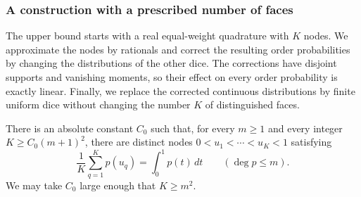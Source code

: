 \subsubsection{A construction with a prescribed number of faces}

The upper bound starts with a real equal-weight quadrature with \(K\)
nodes.  We approximate the nodes by rationals and correct the resulting
order probabilities by changing the distributions of the other dice.
The corrections have disjoint supports and vanishing moments, so their
effect on every order probability is exactly linear.  Finally, we replace
the corrected continuous distributions by finite uniform dice without
changing the number \(K\) of distinguished faces.

\begin{lemma}\label{individual-real-rule}
There is an absolute constant \(C_0\) such that, for every \(m\geq1\)
and every integer \(K\geq C_0(m+1)^2\), there are distinct nodes
\(0<u_1<\cdots<u_K<1\) satisfying
\[
  \frac1K\sum_{q=1}^K p(u_q)=\int_0^1p(t)\,dt
  \qquad(\deg p\leq m).
\]
We may take \(C_0\) large enough that \(K\geq m^2\).
\end{lemma}

